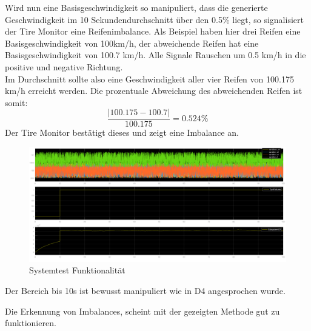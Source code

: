 Wird nun eine Basisgeschwindigkeit so manipuliert, dass die generierte Geschwindigkeit im 10 Sekundendurchschnitt über den 0.5\% liegt, so signalisiert der Tire Monitor eine Reifenimbalance. Als Beispiel haben hier drei Reifen eine Basisgeschwindigkeit von 100km/h, der abweichende Reifen hat eine Basisgeschwindigkeit von 100.7 km/h. Alle Signale Rauschen um 0.5 km/h in die positive und negative Richtung.\\
Im Durchschnitt sollte also eine Geschwindigkeit aller vier Reifen von 100.175 km/h erreicht werden. Die prozentuale Abweichung des abweichenden Reifen ist somit:
$$
\dfrac{|100.175-100.7|}{100.175} = 0.524\%
$$
Der Tire Monitor bestätigt dieses und zeigt eine Imbalance an.
\begin{figure}[H]
	\centering
	\includegraphics[width=0.95\linewidth]{../Graphiken/RandomAbweichung}
	\caption{Systemtest Funktionalität}
	\label{fig:funkt}
\end{figure}
Der Bereich bis 10s ist bewusst manipuliert wie in D4 angesprochen wurde.

Die Erkennung von Imbalances, scheint mit der gezeigten Methode gut zu funktionieren.
